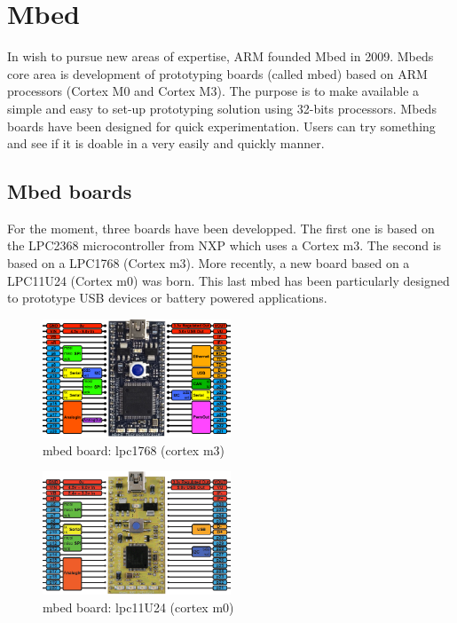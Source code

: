 \documentclass[pdftex,12pt,a4paper]{report}
\begin{document}
\section{Mbed}
In wish to pursue new areas of expertise, ARM founded Mbed in 2009. Mbeds core area is development of prototyping boards (called mbed) based on ARM processors (Cortex M0 and Cortex M3). The purpose is to make available a simple and easy to set-up prototyping solution using 32-bits processors. Mbeds boards have been designed for quick experimentation. Users can try something and see if it is doable in a very easily and quickly manner.

\subsection{Mbed boards}
For the moment, three boards have been developped. The first one is based on the LPC2368 microcontroller from NXP which uses a Cortex m3. The second is based on a LPC1768 (Cortex m3). More recently, a new board based on a LPC11U24 (Cortex m0) was born. This last mbed has been particularly designed to prototype USB devices or battery powered applications. 

\begin{figure}[h!]
\centering
\includegraphics[width=0.5\textwidth]{./lpc1768.png}
\caption{mbed board: lpc1768 (cortex m3)}
\label{mbed_board: lpc1768 (Cortex m3)}
\end{figure}

\begin{figure}[h!]
\centering
\includegraphics[width=0.5\textwidth]{./lpc11U24.png}
\caption{mbed board: lpc11U24 (cortex m0)}
\label{mbed_board: lpc11U24 (Cortex m0)}
\end{figure}
\end{document}
